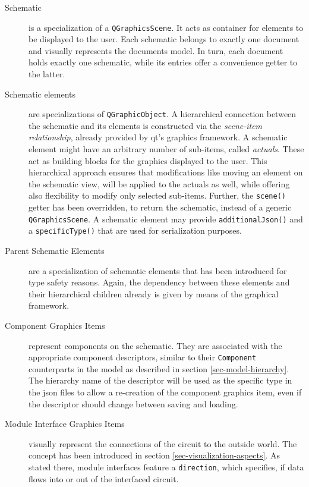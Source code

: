 \begin{description}

	\item[Schematic] is a specialization of a \texttt{QGraphicsScene}. 
	It acts as container for elements to be displayed to the user.
	Each schematic belongs to exactly one document and visually represents the documents model.
	In turn, each document holds exactly one schematic, while its entries offer a convenience getter to the latter.
	
	\item[Schematic elements] are specializations of \texttt{QGraphicObject}.
	A hierarchical connection between the schematic and its elements is constructed via the \emph{scene-item relationship}, already provided by \gls{qt}'s graphics framework.
	A schematic element might have an arbitrary number of sub-items, called \emph{actuals}.
	These act as building blocks for the graphics displayed to the user.
	This hierarchical approach ensures that modifications like moving an element on the schematic view, will be applied to the actuals as well, while offering also flexibility to modify only selected sub-items.
	Further, the \texttt{scene()} getter has been overridden, to return the schematic, instead of a generic \texttt{QGraphicsScene}.
	A schematic element may provide \texttt{additionalJson()} and a \texttt{specificType()} that are used for serialization purposes.
	
	\item[Parent Schematic Elements] are a specialization of schematic elements that has been introduced for type safety reasons.
	Again, the dependency between these elements and their hierarchical children already is given by means of the graphical framework.
	
	\item[Component Graphics Items] represent components on the schematic.
	They are associated with the appropriate component descriptors, similar to their \texttt{Component} counterparts in the model as described in section \ref{sec-model-hierarchy}.
	The hierarchy name of the descriptor will be used as the specific type in the \gls{json} files to allow a re-creation of the component graphics item, even if the descriptor should change between saving and loading.
	
	\item[Module Interface Graphics Items] visually represent the connections of the circuit to the outside world.
	The concept has been introduced in section \ref{sec-visualization-aspects}.
	As stated there, module interfaces feature a \texttt{direction}, which specifies, if data flows into or out of the interfaced circuit.
	

\end{description}
